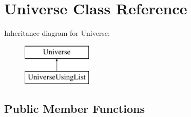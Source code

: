 \hypertarget{class_universe}{}\section{Universe Class Reference}
\label{class_universe}
Inheritance diagram for Universe\+:\begin{figure}[H]
\begin{center}
\leavevmode
\includegraphics[height=2.000000cm]{class_universe}
\end{center}
\end{figure}
\subsection*{Public Member Functions}
